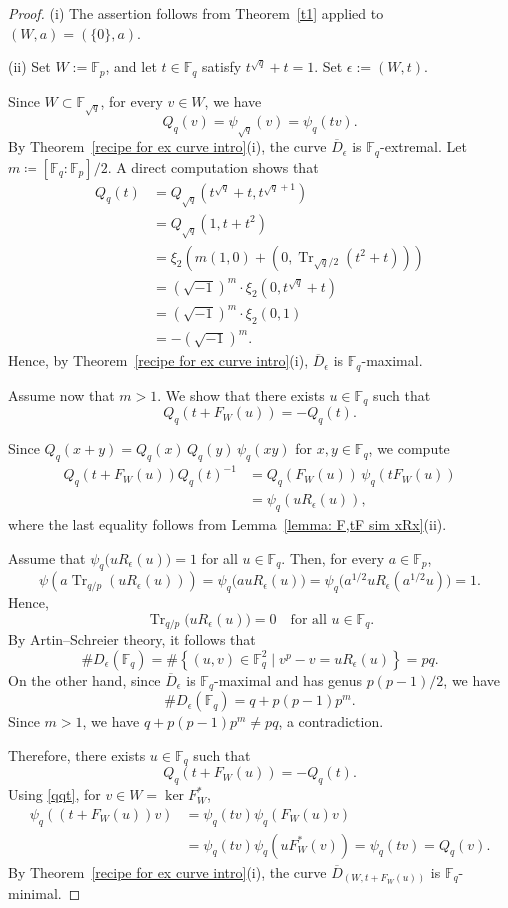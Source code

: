 \documentclass[10pt,a4paper]{amsart}
\def\F{{\mathbb F}}
\DeclareMathOperator{\Tr}{Tr}
\begin{document}
\begin{proof}
(i) The assertion follows from 
Theorem~\ref{t1} applied 
to $(W,a)=(\{0\},a)$. 

\noindent
(ii) Set $W := \F_p$, and 
let $t \in \F_q$ satisfy $t^{\sqrt{q}} + t = 1$. Set $\epsilon:=(W,t)$. 

Since $W\subset\F_{\sqrt{q}}$, for every $v\in W$, we have
\[
Q_q(v)=\psi_{\sqrt{q}}(v)=\psi_q(tv). 
\]
By Theorem~\ref{recipe for ex curve intro}(i), the curve $\overline{D}_{\epsilon}$ is $\F_q$-extremal. 
Let $m\coloneqq [\F_q:\F_p]/2$. 
A direct computation shows that 
\begin{align*}
Q_q(t)
&=Q_{\sqrt{q}}(t^{\sqrt{q}}+t,t^{\sqrt{q}+1})\\
&=Q_{\sqrt{q}}(1,t+t^2)\\
&=\xi_2\!\left(m(1,0)+(0,\Tr_{\sqrt{q}/2}(t^2+t))\right)\\
&=(\sqrt{-1})^{m}\cdot \xi_2(0,t^{\sqrt{q}}+t)\\
&=(\sqrt{-1})^{m}\cdot \xi_2(0,1)\\
&=-(\sqrt{-1})^{m}.
\end{align*}
Hence, by Theorem~\ref{recipe for ex curve intro}(i),
$\overline{D}_{\epsilon}$ is $\F_q$-maximal.





 

Assume now that $m>1$. 
We show that there exists $u \in \F_q$ such that 
\begin{equation}\label{qqt}
Q_q(t + F_W(u)) = - Q_q(t).
\end{equation}

Since $Q_q(x + y) = Q_q(x)\, Q_q(y)\, \psi_q(xy)$ for $x,y \in \F_q$, we compute 
\begin{align*}
Q_q(t + F_W(u))Q_q(t)^{-1}
&= Q_q(F_W(u))\, \psi_q(tF_W(u)) \\
&=  \psi_q(uR_{\epsilon}(u)), 
\end{align*}
where the last equality follows from Lemma~\ref{lemma: F,tF sim  xRx}(ii). 

Assume that $\psi_q\bigl(u R_{\epsilon}(u)\bigr) = 1$ for all $u \in \F_q$. Then, for every $a\in\F_p$, 
\[
\psi(a\Tr_{q/p}(u R_{\epsilon}(u)))=
\psi_q\bigl(au R_{\epsilon}(u)\bigr) =\psi_q\bigl(a^{1/2}u R_{\epsilon}(a^{1/2}u)\bigr) = 1. 
\]
Hence, 
\[
\Tr_{q/p}\bigl(u R_{\epsilon}(u)\bigr) = 0
\quad \text{for all } u \in \F_q.
\]
By Artin--Schreier theory, it follows that 
\[
\# D_{\epsilon}(\F_q) =\# \left\{(u,v) \in \F_q^2 \mid 
v^p-v=u R_{\epsilon}(u)\right\}=pq. 
\]
On the other hand, since $\overline{D}_\epsilon$ is $\F_q$-maximal and has genus $p(p-1)/2$, we have 
\[
\# D_{\epsilon}(\F_q) = q + p(p-1)p^m. 
\]
Since $m > 1$, we have $q + p(p-1)p^m\neq pq$, a contradiction. 

Therefore, there exists $u \in \F_q$ such that 
\[
Q_q(t + F_W(u)) = - Q_q(t).
\]
Using \eqref{qqt}, for $v \in W=\ker F_W^\ast$, 
\begin{align*}
\psi_q((t+F_W(u))v)&=\psi_q(tv) \psi_q(F_W(u) v)\\
&=\psi_q(tv)\psi_q(u F_W^\ast(v))=\psi_q(tv)=Q_q(v). 
\end{align*}
By Theorem~\ref{recipe for ex curve intro}(i), the curve $\overline{D}_{(W,t+F_W(u))}$ is $\F_q$-minimal. 
\end{proof}
\end{document}
